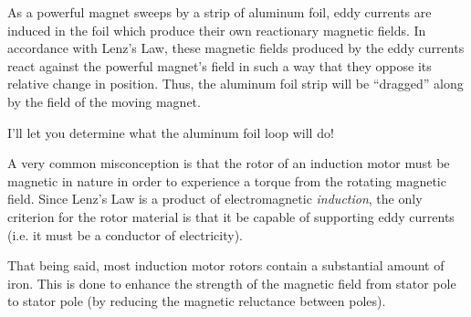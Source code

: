 





As a powerful magnet sweeps by a strip of aluminum foil, eddy currents are induced in the foil which produce their own reactionary magnetic fields.  In accordance with Lenz's Law, these magnetic fields produced by the eddy currents react against the powerful magnet's field in such a way that they oppose its relative change in position.  Thus, the aluminum foil strip will be ``dragged'' along by the field of the moving magnet.

\vskip 10pt

I'll let you determine what the aluminum foil loop will do!







A very common misconception is that the rotor of an induction motor must be magnetic in nature in order to experience a torque from the rotating magnetic field.  Since Lenz's Law is a product of electromagnetic {\it induction}, the only criterion for the rotor material is that it be capable of supporting eddy currents (i.e. it must be a conductor of electricity).

That being said, most induction motor rotors contain a substantial amount of iron.  This is done to enhance the strength of the magnetic field from stator pole to stator pole (by reducing the magnetic reluctance between poles).




